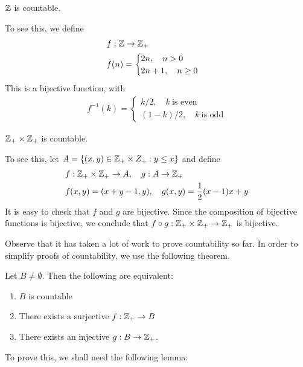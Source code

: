 \begin{claim}
	$\mathbb{Z}$ is countable.
\end{claim}
To see this, we define 
\begin{equation*}
	\begin{split}
		& f: \mathbb{Z} \to \mathbb{Z}_{+}
		\\
		& f(n) = \begin{cases}
			2n, \quad n > 0 \\
			2n+1, \quad n \ge 0
		\end{cases}
	\end{split}
\end{equation*}
This is a bijective function, with 
\begin{equation*}
	\begin{split}
		f^{-1}(k) = 
		\begin{cases}
			k/2, \quad k \ \text{is even} \\
			(1-k)/2, \quad k \ \text{is odd}
		\end{cases}
	\end{split}
\end{equation*}
\begin{claim}
	$\mathbb{Z}_{+} \times \mathbb{Z}_{+}$ is countable.		 
\end{claim}
To see this, let $A = \left\{(x,y) \in \mathbb{Z}_{+} \times Z_{+}: y \le x\right\}$
and define
\begin{equation*}
	\begin{split}
		& f: \mathbb{Z}_{+} \times \mathbb{Z}_{+} \to A, \quad g: A \to \mathbb{Z}_{+} \\
		& f(x,y) = (x + y-1, y), \quad g(x,y) = \frac{1}{2}(x-1)x + y		
	\end{split}
\end{equation*}
It is easy to check that $f$ and $g$ are bijective. Since the composition of
bijective functions is bijective, we conclude that $f \circ g: \mathbb{Z}_{+} \times
\mathbb{Z}_{+} \to \mathbb{Z}_{+}$ is bijective.

Observe that it has taken a lot of work to prove countability so far. 
In order to simplify proofs of countability, we use the following theorem.
\begin{theorem}\label{thm:proof-countability}
	Let $B \neq \emptyset$. Then the following are equivalent:
	\begin{enumerate}
		\item\label{it:1} $B$ is countable
		\item\label{it:2} There exists a surjective $f: \mathbb{Z}_{+} \to B$
		\item\label{it:3} There exists an injective $g: B \to \mathbb{Z}_{+}$. 
	\end{enumerate}
\end{theorem}
To prove this, we shall need the following lemma:

